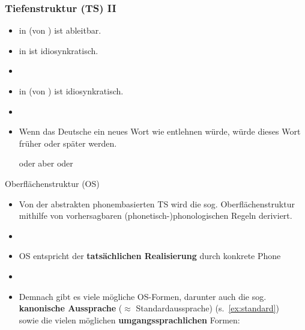 \begin{frame}
\frametitle{Tiefenstruktur (TS) II}

\begin{itemize}
	\item \textipa{[t]} in  (von ) ist ableitbar.
	\item {} in  ist idiosynkratisch.
	\item[]
	\item {} in  (von ) ist idiosynkratisch.
	\item[]
	\item Wenn das Deutsche ein neues Wort wie  \textipa{[koUd]} entlehnen würde, würde dieses Wort früher oder später  werden.
	
	\ea \textipa{[kOUt]} oder \textipa{[ko:t]} aber  oder  
	\z
	
\end{itemize}

\end{frame}



\begin{frame}{Oberflächenstruktur (OS)}

\begin{itemize}
	\item Von der abstrakten phonembasierten TS wird die sog. Oberflächenstruktur mithilfe von vorhersagbaren (phonetisch-)phonologischen Regeln deriviert.
	\item[]
	\item OS entspricht der \textbf{tatsächlichen Realisierung} durch konkrete Phone \ras \textipa{[ ]}
	\item[]
	\item Demnach gibt es viele mögliche OS-Formen, darunter auch die sog.\\
		\textbf{kanonische Aussprache} ($\approx$ Standardaussprache) (s.~\ref{ex:standard})\\
		sowie die vielen möglichen \textbf{umgangssprachlichen} Formen:

\eal
\ex \label{ex:standard} \textipa{[Pe:b@n]}
\ex \textipa{[Pe:bn]}
\ex \textipa{[Pe:bm]}
\ex \textipa{[Pe:m]}
\zl
\end{itemize}

\end{frame}


